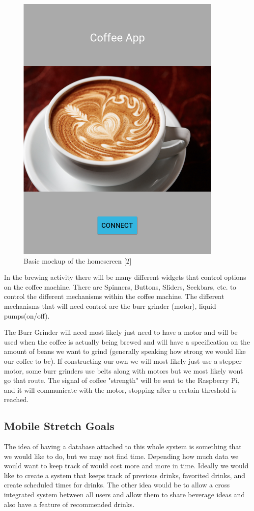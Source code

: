 \documentclass[conference]{IEEEtran}
\begin{document}
\begin{figure}[!ht]
\centering
\includegraphics[width=0.5\columnwidth]{connect.png}
\caption{Basic mockup of the homescreen [2]}
\end{figure} 

\par  In the brewing activity there will be many different widgets that control options
on the coffee machine. There are Spinners, Buttons, Sliders, Seekbars, etc. to control
the different mechanisms within the coffee machine. The different
mechanisms that will need control are the burr grinder (motor), liquid pumps(on/off).

\par The Burr Grinder will need most likely
just need to have a motor and will be used when the coffee is actually being brewed and will
have a specification on the amount of beans we want to grind (generally speaking how strong
we would like our coffee to be). If constructing our own we will most likely just use a stepper motor, some
burr grinders use belts along with motors but we most likely wont go that route. The signal of coffee "strength"
will be sent to the Raspberry Pi, and it will communicate with the motor, stopping after a certain threshold is reached.
\par

\subsection{Mobile Stretch Goals}
The idea of having a database attached to this whole system is something that we would like to do, but we may not find time.
Depending how much data we would want to keep track of would cost more and more in time.
Ideally we would like to create a system that keeps track of previous drinks, favorited drinks, and create scheduled times for drinks.
The other idea would be to allow a cross integrated system between all users and allow them to share beverage ideas and also
have a feature of recommended drinks.
\end{document}
